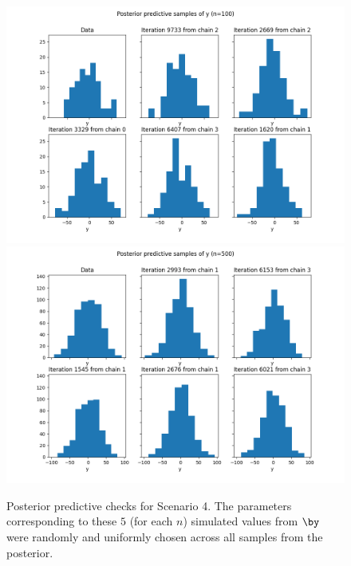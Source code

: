 \documentclass[a4paper, 10pt]{article}
\begin{document}
\begin{figure}[htb]
    \begin{center}
        \includegraphics[height=.5\textwidth]{../outputs/artificial_scenarios_n=20/scenario_4/posterior_predictive_check.png}
        \includegraphics[height=.5\textwidth]{../outputs/artificial_scenarios_n=100/scenario_4/posterior_predictive_check.png}
    \end{center}
    \caption[Posterior predictive checks for Scenario 4.]{Posterior predictive checks for Scenario 4. The parameters corresponding to these $ 5$ (for each $ n $) simulated values from $ \by $ were randomly and uniformly chosen across all samples from the posterior.}
    \label{fig: posterior predictive check scenario 4}
\end{figure}
\end{document}
